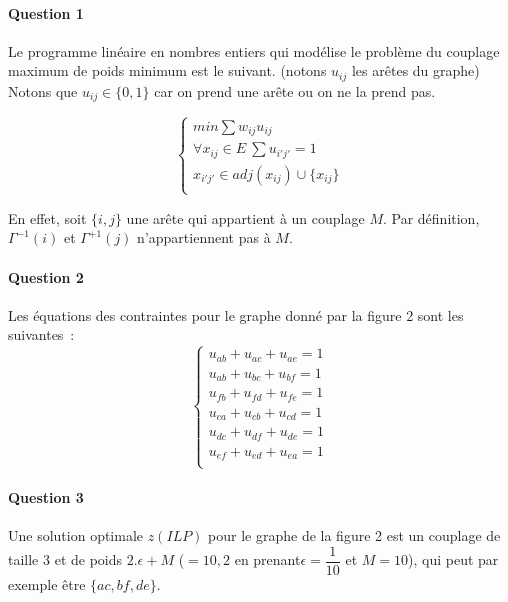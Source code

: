 \paragraph{Question 1}Le programme linéaire en nombres entiers qui modélise le
  problème du couplage maximum de poids minimum est le suivant.
  (notons $u_{ij}$ les arêtes du graphe)
Notons que $u_{ij} \in \{0, 1\}$ car on prend une arête ou on ne la
prend pas.

\begin{equation}
\begin{cases}
min \sum w_{ij} u_{ij} \\
\forall x_{ij} \in E ~ \sum u_{i' j'} = 1 \\
 x_{i' j'} \in adj(x_{ij}) \cup \{ x_{ij} \} \\
\end{cases}
\end{equation}

En effet, soit $\{ i, j \}$ une arête qui appartient à un couplage
$M$. Par définition, $\Gamma^{-1}(i) $ et $\Gamma^{+1}(j)$
n'appartiennent pas à $M$.

\paragraph{Question 2}
Les équations des contraintes pour le graphe donné par la figure 2
sont les suivantes~:
\begin{equation}
\begin{cases}
u_{ab}+u_{ac}+u_{ae}=1 \\
u_{ab}+u_{bc}+u_{bf}=1 \\
u_{fb}+u_{fd}+u_{fe}=1 \\
u_{ca}+u_{cb}+u_{cd}=1 \\
u_{dc}+u_{df}+u_{de}=1 \\
u_{ef}+u_{ed}+u_{ea}=1 \\
\end{cases}
\end{equation}

\paragraph{Question 3}
Une solution optimale $z(ILP)$ pour le graphe de la figure 2 est un
couplage de taille 3 et de poids $2.\epsilon + M$ ($= 10,2$ en prenant$\epsilon = \dfrac{1}{10}$ et $M=10$), qui peut par
exemple être $\{
ac, bf, de \}$. 

